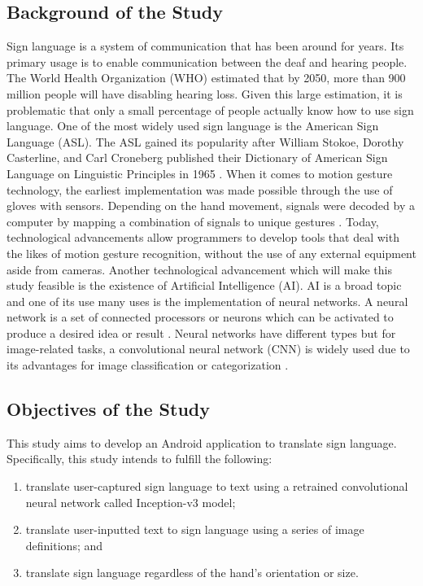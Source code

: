\documentclass[journal]{./IEEE/IEEEtran}
\begin{document}
\subsection{Background of the Study}
Sign language is a system of communication that has been around for years. Its primary usage is to enable communication between the deaf and hearing people. The World Health Organization (WHO) \cite{WHO2018} estimated that by 2050, more than 900 million people will have disabling hearing loss. Given this large estimation, it is problematic that only a small percentage of people actually know how to use sign language. One of the most widely used sign language is the American Sign Language (ASL). The ASL gained its popularity after William Stokoe, Dorothy Casterline, and Carl Croneberg published their Dictionary of American Sign Language on Linguistic Principles in 1965 \cite{Wilcox1991}.
\newline
\indent When it comes to motion gesture technology, the earliest implementation was made possible through the use of gloves with sensors. Depending on the hand movement, signals were decoded by a computer by mapping a combination of signals to unique gestures \cite{Sharma2015}.  Today, technological advancements allow programmers to develop tools that deal with the likes of motion gesture recognition, without the use of any external equipment aside from cameras.
\newline
\indent Another technological advancement which will make this study feasible is the existence of Artificial Intelligence (AI). AI is a broad topic and one of its use many uses is the implementation of neural networks. A neural network is a set of connected processors or neurons which can be activated to produce a desired idea or result \cite{Schmidhuber2015}. Neural networks have different types but for image-related tasks, a convolutional neural network (CNN) is widely used due to its advantages for image classification or categorization \cite{Wu2016}.

\subsection{Objectives of the Study}
This study aims to develop an Android application to translate sign language. Specifically, this study intends to fulfill the following:

\begin{enumerate}
\item translate user-captured sign language to text using a retrained convolutional neural network called Inception-v3 model;
\item translate user-inputted text to sign language using a series of image definitions; and
\item translate sign language regardless of the hand's orientation or size.
\end{enumerate}
\end{document}
